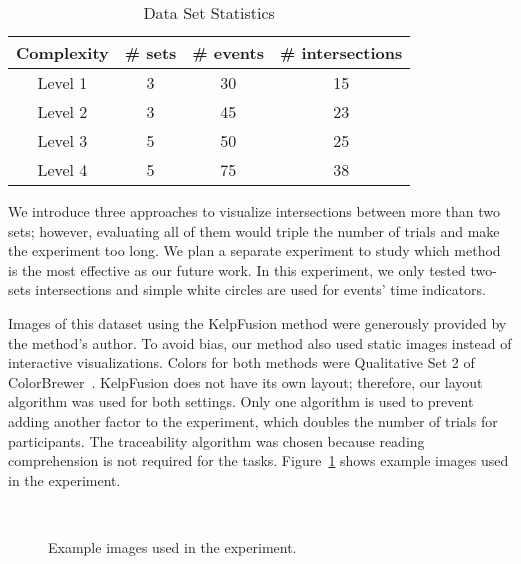 \begin{table}[ht]
\centering
\caption{Data Set Statistics}
\label{table:dataset}
\begin{tabular}{cccc}
	\toprule
	Complexity & \# sets & \# events & \# intersections \\ 
	\midrule
	Level 1 & 3 & 30 & 15 \\ 
	Level 2 & 3 & 45 & 23 \\ 
	Level 3 & 5 & 50 & 25 \\ 
	Level 4 & 5 & 75 & 38 \\ 
	\bottomrule
\end{tabular} 
\end{table}

We introduce three approaches to visualize intersections between more than two sets; however, evaluating all of them would triple the number of trials and make the experiment too long. We plan a separate experiment to study which method is the most effective as our future work. In this experiment, we only tested two-sets intersections and simple white circles are used for events' time indicators. 

Images of this dataset using the KelpFusion method were generously provided by the method's author. To avoid bias, our method also used static images instead of interactive visualizations. Colors for both methods were Qualitative Set 2 of ColorBrewer~\cite{Harrower2003}. KelpFusion does not have its own layout; therefore, our layout algorithm was used for both settings. Only one algorithm is used to prevent adding another factor to the experiment, which doubles the number of trials for participants. The traceability algorithm was chosen because reading comprehension is not required for the tasks. Figure~\ref{fig:evaluation} shows example images used in the experiment. 

\begin{figure}[ht]
	\centering
	\\
	\caption{Example images used in the experiment.}
	\label{fig:evaluation}
\end{figure}


